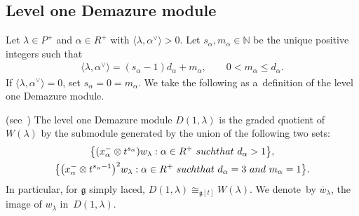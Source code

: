 \documentclass[11pt]{article}
\numberwithin{equation}{section}
\begin{document}
\subsection{Level one Demazure module}\label{section3.2}

Let $\lambda\in P^{+}$ and $\alpha\in R^{+}$ with $\langle \lambda, \alpha^{\vee}\rangle > 0$.
Let $s_\alpha, m_\alpha \in \mathbb{N}$ be the unique positive integers such that
\begin{gather*}
\langle \lambda, \alpha^{\vee}\rangle = (s_\alpha-1)d_\alpha + m_\alpha,
\qquad
0<m_\alpha\leq d_\alpha.
\end{gather*}
If $\langle \lambda, \alpha^{\vee}\rangle = 0$, set $s_\alpha=0=m_\alpha$.
We take the following as a~def\/inition of the level one Demazure module.
\begin{definition}
\textup{(see~\cite[Corollary 3.5]{CV})} The level one Demazure module $D(1,\lambda)$ is the graded quotient of
$W(\lambda)$ by the submodule generated by the union of the following two sets:
\begin{gather}
\big\{(x^{-}_{\alpha} \otimes t^{s_{\alpha}})  w_{\lambda}: \alpha\in R^{+}~\textup{such that}~d_{\alpha} > 1\big\},
\label{dm1}
\\
\big\{\big(x^{-}_{\alpha} \otimes t^{s_{\alpha}-1}\big)^2  w_{\lambda}: \alpha\in R^{+}~\textup{such that}~d_\alpha =3~\textup{and}~m_\alpha=1\big\}.
\label{dm2}
\end{gather}
In particular, for $\mathfrak{g}$ simply laced, $D(1,\lambda)\cong_{\mathfrak{g}[t]} W(\lambda)$. We denote~by
$\overline{w}_\lambda$, the image of $w_\lambda$ in~$D(1,\lambda)$.
\end{definition}
\end{document}
